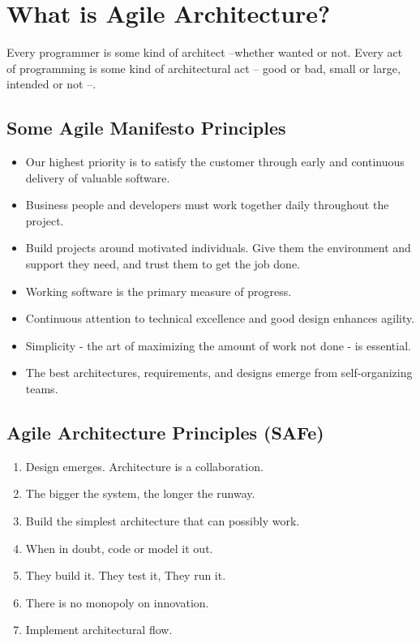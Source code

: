 \hypertarget{what-is-agile-architecture}{%
\section{What is Agile Architecture?}\label{what-is-agile-architecture}}

Every programmer is some kind of architect --whether wanted or not.
Every act of programming is some kind of architectural act -- good or
bad, small or large, intended or not --.

\hypertarget{some-agile-manifesto-principles}{%
\subsection{Some Agile Manifesto
Principles}\label{some-agile-manifesto-principles}}

\begin{itemize}
\tightlist
\item
  Our highest priority is to satisfy the customer through early and
  continuous delivery of valuable software.
\item
  Business people and developers must work together daily throughout the
  project.
\item
  Build projects around motivated individuals. Give them the environment
  and support they need, and trust them to get the job done.
\item
  Working software is the primary measure of progress.
\item
  Continuous attention to technical excellence and good design enhances
  agility.
\item
  Simplicity - the art of maximizing the amount of work not done - is
  essential.
\item
  The best architectures, requirements, and designs emerge from
  self-organizing teams.
\end{itemize}

\hypertarget{agile-architecture-principles-safe}{%
\subsection{Agile Architecture Principles
(SAFe)}\label{agile-architecture-principles-safe}}

\begin{enumerate}
\def\labelenumi{\arabic{enumi}.}
\tightlist
\item
  Design emerges. Architecture is a collaboration.
\item
  The bigger the system, the longer the runway.
\item
  Build the simplest architecture that can possibly work.
\item
  When in doubt, code or model it out.
\item
  They build it. They test it, They run it.
\item
  There is no monopoly on innovation.
\item
  Implement architectural flow.
\end{enumerate}



